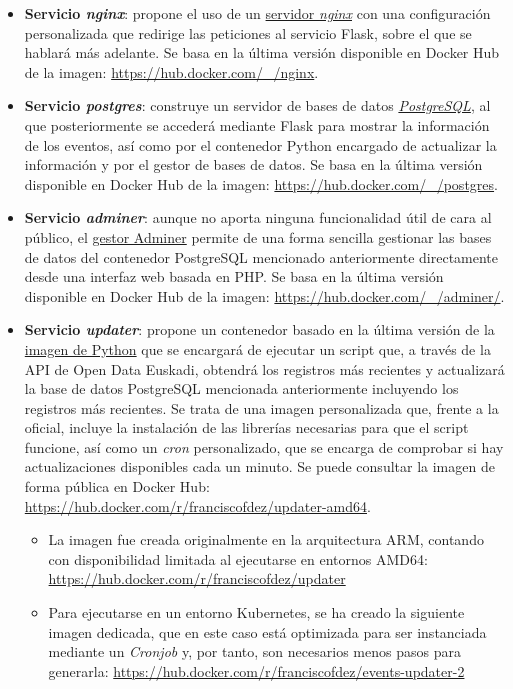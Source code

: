 \documentclass{report}
\begin{document}
        \begin{itemize}
            \item \textbf{Servicio \textit{nginx}}: propone el uso de un \href{https://nginx.org/en/}{servidor \textit{nginx}} con una configuración personalizada que redirige las peticiones al servicio Flask, sobre el que se hablará más adelante. Se basa en la última versión disponible en Docker Hub de la imagen: \url{https://hub.docker.com/_/nginx}.
            \item \textbf{Servicio \textit{postgres}}: construye un servidor de bases de datos \textit{\href{https://www.postgresql.org}{PostgreSQL}}, al que posteriormente se accederá mediante Flask para mostrar la información de los eventos, así como por el contenedor Python encargado de actualizar la información y por el gestor de bases de datos. Se basa en la última versión disponible en Docker Hub de la imagen: \url{https://hub.docker.com/_/postgres}.
            \item \textbf{Servicio \textit{adminer}}: aunque no aporta ninguna funcionalidad útil de cara al público, el \href{https://www.adminer.org}{gestor Adminer} permite de una forma sencilla gestionar las bases de datos del contenedor PostgreSQL mencionado anteriormente directamente desde una interfaz web basada en PHP. Se basa en la última versión disponible en Docker Hub de la imagen: \url{https://hub.docker.com/_/adminer/}.
            \item \textbf{Servicio \textit{updater}}: propone un contenedor basado en la última versión de la \href{https://hub.docker.com/_/python}{imagen de Python} que se encargará de ejecutar un script que, a través de la API de Open Data Euskadi, obtendrá los registros más recientes y actualizará la base de datos PostgreSQL mencionada anteriormente incluyendo los registros más recientes. Se trata de una imagen personalizada que, frente a la oficial, incluye la instalación de las librerías necesarias para que el script funcione, así como un \textit{cron} personalizado, que se encarga de comprobar si hay actualizaciones disponibles cada un minuto. Se puede consultar la imagen de forma pública en Docker Hub: \url{https://hub.docker.com/r/franciscofdez/updater-amd64}.
            \begin{itemize}
                \item La imagen fue creada originalmente en la arquitectura ARM, contando con disponibilidad limitada al ejecutarse en entornos AMD64: \url{https://hub.docker.com/r/franciscofdez/updater}
                \item Para ejecutarse en un entorno Kubernetes, se ha creado la siguiente imagen dedicada, que en este caso está optimizada para ser instanciada mediante un \textit{Cronjob} y, por tanto, son necesarios menos pasos para generarla: \url{https://hub.docker.com/r/franciscofdez/events-updater-2}

\end{itemize}
\end{itemize}
\end{document}
